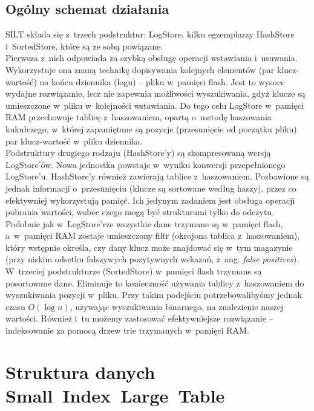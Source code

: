 \documentclass[declaration,shortabstract,masc]{iithesis}
\begin{document}
		\section{Ogólny schemat działania}
			SILT składa się z~trzech podstruktur: LogStore, kilku egzemplarzy HashStore i~SortedStore, które są ze sobą powiązane.\\
			\indent Pierwsza z~nich odpowiada za szybką obsługę operacji wstawiania i~usuwania. Wykorzystuje ona znaną technikę dopisywania kolejnych elementów (par klucz-wartość) na końcu dziennika (logu) -- pliku w~pamięci flash. Jest to wysoce wydajne rozwiązanie, lecz nie zapewnia możliwości wyszukiwania, gdyż klucze są umieszczone w~pliku w~kolejności wstawiania. Do tego celu LogStore w~pamięci RAM przechowuje tablicę z~haszowaniem, opartą o~metodę haszowania kukułczego, w~której zapamiętane są pozycje (przesunięcie od początku pliku) par klucz-wartość w~pliku dziennika.\\
			\indent Podstruktury drugiego rodzaju (HashStore'y) są skompresowaną wersją LogStore'ów. Nowa jednostka powstaje w~wyniku konwersji przepełnionego LogStore'u. HashStore'y również zawierają tablice z~haszowaniem. Pozbawione są jednak informacji o~przesunięciu (klucze są sortowane według haszy), przez co efektywniej wykorzystują pamięć. Ich jedynym zadaniem jest obsługa operacji pobrania wartości, wobec czego mogą być strukturami tylko do odczytu. Podobnie jak w~LogStore'rze wszystkie dane trzymane są w~pamięci flash, a~w~pamięci RAM zostaje umieszczony filtr (okrojona tablica z~haszowaniem), który wstępnie określa, czy dany klucz może znajdować się w~tym magazynie (przy niskim odsetku fałszywych pozytywnych wskazań, z~ang. \textit{false positives}).\\
			\indent W~trzeciej podstrukturze (SortedStore) w~pamięci flash trzymane są posortowane dane. Eliminuje to konieczność używania tablicy z~haszowaniem do wyszukiwania pozycji w~pliku. Przy takim podejściu potrzebowalibyśmy jednak czasu $O\left(\log n\right)$, używając wyszukiwania binarnego, na znalezienie naszej wartości. Również i~tu możemy zastosować efektywniejsze rozwiązanie -- indeksowanie za pomocą drzew trie trzymanych w~pamięci RAM.
	\chapter{Struktura danych Small~Index~Large~Table}
\end{document}
